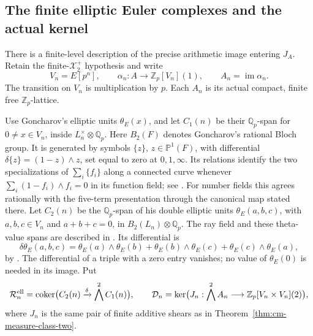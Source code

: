 \subsection{The finite elliptic Euler complexes and the actual kernel}
\label{subsec:cm-elliptic-euler-kernel}

There is a finite-level description of the precise arithmetic
image entering \(J_A\).  Retain the finite-\(\mathcal X_2^+\)
hypothesis and write
\[
 V_n=E[p^n],\qquad
 \alpha_n:A\longrightarrow\mathbb Z_p[V_n](1),\qquad
 A_n=\operatorname{im}\alpha_n.
\]
The transition on \(V_n\) is multiplication by \(p\).
Each \(A_n\) is its actual compact, finite free
\(\mathbb Z_p\)-lattice.

Use Goncharov's elliptic units \(\theta_E(x)\), and let
\(C_1(n)\) be their \(\mathbb Q_p\)-span for
\(0\ne x\in V_n\), inside \(L_n^\times\otimes\mathbb Q_p\).
Here \(B_2(F)\) denotes Goncharov's rational Bloch group.
It is generated by symbols \(\{z\}\), \(z\in\mathbb P^1(F)\),
with differential \(\delta\{z\}=(1-z)\wedge z\), set equal to
zero at \(0,1,\infty\). Its relations identify the two
specializations of \(\sum_i\{f_i\}\) along a connected curve
whenever \(\sum_i(1-f_i)\wedge f_i=0\) in its function field;
see \cite[Section 2.1, p.~10]{GoncharovEuler}.
For number fields this agrees rationally with the five-term
presentation through the canonical map stated there.
Let \(C_2(n)\) be the \(\mathbb Q_p\)-span of his
double elliptic units \(\theta_E(a,b,c)\), with
\(a,b,c\in V_n\) and \(a+b+c=0\), in
\(B_2(L_n)\otimes\mathbb Q_p\).
The ray field and these theta-value spans are described in
\cite[Definition 5.2, Proposition 5.3 and Definition 5.4,
p.~27]{GoncharovEuler}.
Its differential is
\begin{equation}\label{eq:cm-elliptic-triangle-delta}
 \delta\theta_E(a,b,c)
   =\theta_E(a)\wedge\theta_E(b)
    +\theta_E(b)\wedge\theta_E(c)
    +\theta_E(c)\wedge\theta_E(a),
\end{equation}
by \cite[Theorem 2.10(a), equation (38), p.~15]{GoncharovEuler}.
The differential of a triple with a zero entry vanishes;
no value of \(\theta_E(0)\) is needed in its image.
Put
\[
 \mathcal R_n^{\rm ell}
   =\operatorname{coker}\bigl(C_2(n)
                          \xrightarrow{\delta}\bigwedge^2C_1(n)\bigr),
 \qquad
 \mathcal D_n=\ker\bigl(J_n:\bigwedge^2A_n
                   \longrightarrow\mathbb Z_p[V_n\times V_n](2)\bigr),
\]
where \(J_n\) is the same pair of finite additive shears
as in Theorem~\ref{thm:cm-measure-class-two}.

